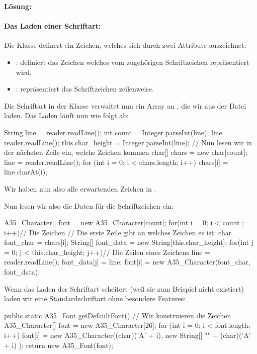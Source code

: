 \documentclass[table]{sopra-base}
\makeatletter
\newenvironment{solution}{\null\par\noindent\textbf{\textcolor{sob@col@uulm@cs}{Lösung:}}\newline\bgroup\color{black}\slshape\ignorespaces}{\egroup}
\makeatother
\begin{document}
\begin{solution}
    \paragraph{Das Laden einer Schriftart:}
    \bgroup
        Die Klasse  definert ein Zeichen, welches sich durch zwei
        Attribute auszeichnet:
        \begin{itemize}[nolistsep]
            \item {}: definiert das Zeichen welches vom zugehörigen Schriftzeichen repräsentiert wird.
            \item {}: repräsentiert das Schriftzeichen zeilenweise.
        \end{itemize}
        Die Schriftart in der Klasse  verwaltet nun ein Array an , die wir aus der Datei laden. Das Laden läuft nun wie folgt ab:
{\upshape
\begin{java}[firstnumber=66]
String line = reader.readLine();
int count = Integer.parseInt(line);
line = reader.readLine();
this.char_height = Integer.parseInt(line);
// Nun lesen wir in der nächsten Zeile ein, welche Zeichen kommen
char[] chars = new char[count];
line = reader.readLine();
for (int i = 0; i < chars.length; i++)
    chars[i] = line.charAt(i);
\end{java}
}
Wir haben nun also alle erwartenden Zeichen in . \par{}
Nun lesen wir also die Daten für die Schriftzeichen ein:
{\upshape
\begin{java}[firstnumber=75]
A35_Character[] font = new A35_Character[count];
for(int i = 0; i < count ; i++){// Die Zeichen
    // Die erste Zeile gibt an welches Zeichen es ist: 
    char font_char = chars[i];
    String[] font_data = new String[this.char_height];
    for(int j = 0; j < this.char_height; j++){// Die Zeilen eines Zeichens
        line = reader.readLine();
        font_data[j] = line;
    }
    font[i] = new A35_Character(font_char, font_data);
}
\end{java}
}
    Wenn das Laden der Schriftart scheitert (weil sie zum Beispiel nicht existiert) laden wir eine Standardschriftart ohne besondere Features:
{\upshape
\begin{java}[firstnumber=102]
public static A35_Font getDefaultFont(){
    // Wir konstruieren die Zeichen
    A35_Character[] font = new A35_Character[26];
    for (int i = 0; i < font.length; i++) {
        font[i] = new A35_Character((char)('A' + i),
                        new String[] {"" + (char)('A' + i)}
                  );
    }
    return new A35_Font(font);
}
\end{java}
}

\end{solution}
\end{document}
